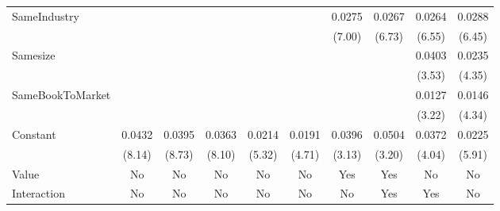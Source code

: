 {\begin{tabular}{l*{9}{c}}
SameIndustry        &                     &                     &                     &                     &                     &      0.0275\sym{***}&      0.0267\sym{***}&      0.0264\sym{***}&      0.0288\sym{***}\\
                    &                     &                     &                     &                     &                     &      (7.00)         &      (6.73)         &      (6.55)         &      (6.45)         \\
[1em]
Samesize            &                     &                     &                     &                     &                     &                     &                     &      0.0403\sym{***}&      0.0235\sym{***}\\
                    &                     &                     &                     &                     &                     &                     &                     &      (3.53)         &      (4.35)         \\
[1em]
SameBookToMarket    &                     &                     &                     &                     &                     &                     &                     &      0.0127\sym{**} &      0.0146\sym{***}\\
                    &                     &                     &                     &                     &                     &                     &                     &      (3.22)         &      (4.34)         \\
[1em]
Constant            &      0.0432\sym{***}&      0.0395\sym{***}&      0.0363\sym{***}&      0.0214\sym{***}&      0.0191\sym{***}&      0.0396\sym{**} &      0.0504\sym{**} &      0.0372\sym{***}&      0.0225\sym{***}\\
                    &      (8.14)         &      (8.73)         &      (8.10)         &      (5.32)         &      (4.71)         &      (3.13)         &      (3.20)         &      (4.04)         &      (5.91)         \\
\hline
Value               &          No         &          No         &          No         &          No         &          No         &         Yes         &         Yes         &          No         &          No         \\
Interaction         &          No         &          No         &          No         &          No         &          No         &          No         &         Yes         &         Yes         &          No         \\

\end{tabular}}
